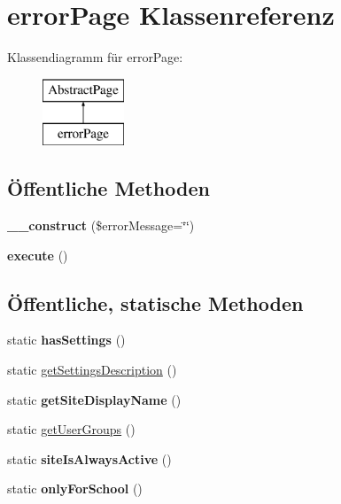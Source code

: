 \hypertarget{classerror_page}{}\section{error\+Page Klassenreferenz}
\label{classerror_page}
Klassendiagramm für error\+Page\+:\begin{figure}[H]
\begin{center}
\leavevmode
\includegraphics[height=2.000000cm]{classerror_page}
\end{center}
\end{figure}
\subsection*{Öffentliche Methoden}
\begin{DoxyCompactItemize}
\item 
\mbox{\label{classerror_page_a027e53125c173490bc8b5a1247e62229}} 
{\bfseries \+\_\+\+\_\+construct} (\$error\+Message=\char`\"{}\char`\"{})
\item 
\mbox{\label{classerror_page_afba0c2c2fa2562c9449f476d016da382}} 
{\bfseries execute} ()
\end{DoxyCompactItemize}
\subsection*{Öffentliche, statische Methoden}
\begin{DoxyCompactItemize}
\item 
\mbox{\label{classerror_page_a88141bfed561077061f61aaf08691432}} 
static {\bfseries has\+Settings} ()
\item 
static \mbox{\hyperlink{classerror_page_aa6b1e30ac079522d33972499aa5d9386}{get\+Settings\+Description}} ()
\item 
\mbox{\label{classerror_page_ae7866d55bd0612d407eceb083317aa51}} 
static {\bfseries get\+Site\+Display\+Name} ()
\item 
static \mbox{\hyperlink{classerror_page_ab2840ad0c3ff7206f01842d4c738ff33}{get\+User\+Groups}} ()
\item 
\mbox{\label{classerror_page_adacdfec7debd49fbf521546805d7f02d}} 
static {\bfseries site\+Is\+Always\+Active} ()
\item 
\mbox{\label{classerror_page_a7ddc0ce6bb9b11953e0ef2826ebb5177}} 
static {\bfseries only\+For\+School} ()
\end{DoxyCompactItemize}
